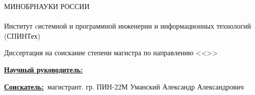 \begin{frame}
    \begin{center}
        МИНОБРНАУКИ РОССИИ \\
        \thesisOrganization \\
        Институт cистемной и программной инженерии и информационных технологий (СПИНТех)
        \newline

        \textbf{\large \thesisTitle}
        \newline

        Диссертация на соискание степени магистра по направлению \thesisSpecialtyNumber <<\thesisSpecialtyTitle>>
    \end{center}

    \underline{\textbf{Научный руководитель:}}~\supervisorRegaliaShort~\supervisorFio

    \underline{\textbf{Соискатель:}}~магистрант. гр. ПИН-22М Уманский Александр Александрович

\end{frame}
